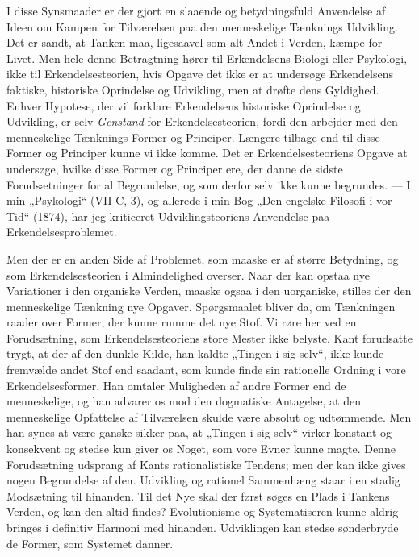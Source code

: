 \documentclass[12pt,a4paper,openany]{book}
\newcommand{\opage}[1]{\marginnote{\footnotesize\textit{[#1]}}}
\begin{document}
I disse Synsmaader er der gjort en slaaende og betydningsfuld
Anvendelse af Ideen om Kampen for Tilværelsen paa
den menneskelige Tænknings Udvikling. Det er sandt, at
Tanken maa, ligesaavel som alt Andet i Verden, kæmpe for
Livet. Men hele denne Betragtning hører til Erkendelsens Biologi
eller Psykologi, ikke til Erkendelsesteorien, hvis Opgave
det ikke er at undersøge Erkendelsens faktiske, historiske Oprindelse
og Udvikling, men at drøfte dens Gyldighed. Enhver
\setcounter{footnote}{0}%
\opage{217}Hypotese, der vil forklare Erkendelsens historiske Oprindelse
og Udvikling, er selv \textit{Genstand} for Erkendelsesteorien, fordi den
arbejder med den menneskelige Tænknings Former og Principer.
Længere tilbage end til disse Former og Principer kunne
vi ikke komme. Det er Erkendelsesteoriens Opgave at undersøge,
hvilke disse Former og Principer ere, der danne de sidste
Forudsætninger for al Begrundelse, og som derfor selv ikke
kunne begrundes. --- I min „Psykologi“ (VII C, 3), og allerede
i min Bog „Den engelske Filosofi i vor Tid“ (1874), har jeg
kriticeret Udviklingsteoriens Anvendelse paa Erkendelsesproblemet.


Men der er en anden Side af Problemet, som maaske er
af større Betydning, og som Erkendelsesteorien i Almindelighed
overser. Naar der kan opstaa nye Variationer i den organiske
Verden, maaske ogsaa i den uorganiske, stilles der den menneskelige
Tænkning nye Opgaver. Spørgsmaalet bliver da,
om Tænkningen raader over Former, der kunne rumme det
nye Stof. Vi røre her ved en Forudsætning, som Erkendelsesteoriens
store Mester ikke belyste. Kant forudsatte trygt, at
der af den dunkle Kilde, han kaldte „Tingen i sig selv“, ikke
kunde fremvælde andet Stof end saadant, som kunde finde sin
rationelle Ordning i vore Erkendelsesformer. Han omtaler Muligheden
af andre Former end de menneskelige, og han advarer
os mod den dogmatiske Antagelse, at den menneskelige Opfattelse
af Tilværelsen skulde være absolut og udtømmende. Men
han synes at være ganske sikker paa, at „Tingen i sig selv“
virker konstant og konsekvent og stedse kun giver os Noget,
som vore Evner kunne magte. Denne Forudsætning udsprang
af Kants rationalistiske Tendens; men der kan ikke gives nogen
Begrundelse af den. Udvikling og rationel Sammenhæng
staar i en stadig Modsætning til hinanden. Til det Nye skal
der først søges en Plads i Tankens Verden, og kan den altid
findes? Evolutionisme og Systematiseren kunne aldrig bringes
i definitiv Harmoni med hinanden. Udviklingen kan stedse
sønderbryde de Former, som Systemet danner.
\end{document}
